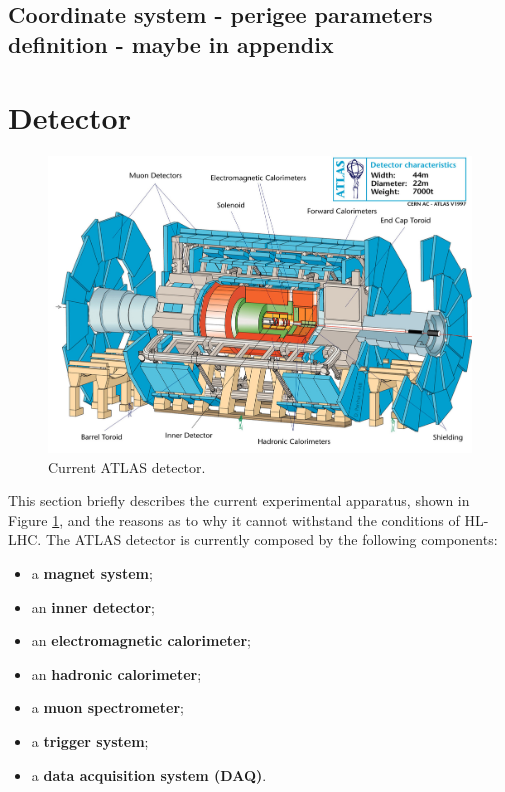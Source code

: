 \documentclass[a4paper,twoside,12pt]{article}
\begin{document}
\subsection{Coordinate system - perigee parameters definition - maybe in appendix}


\clearpage

\section{Detector} \label{Detector}

\begin{figure} [h]
	\includegraphics[width=\textwidth]{atlasdet}
	\caption{Current ATLAS detector.}
	\label{fig:current_atlasdet}
\end{figure}

This section briefly describes the current experimental apparatus, shown in Figure \ref{fig:current_atlasdet}, and the reasons as to why it cannot withstand the conditions of HL-LHC. The ATLAS detector is currently composed by the following components:
\begin{itemize}
\item a \textbf{magnet system};
\item an \textbf{inner detector};
\item an \textbf{electromagnetic calorimeter};
\item an \textbf{hadronic calorimeter};
\item a \textbf{muon spectrometer};
\item a \textbf{trigger system};
\item a \textbf{data acquisition system (DAQ)}.
\end{itemize}
\end{document}

